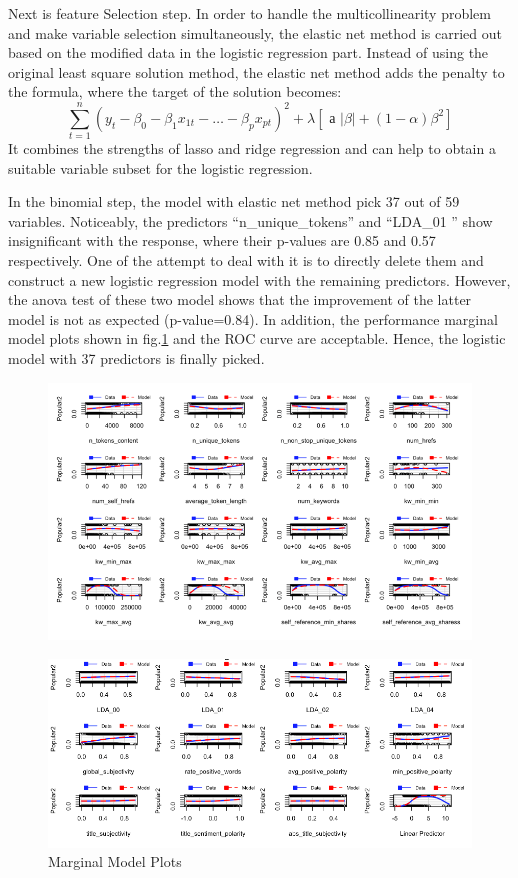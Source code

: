 \documentclass[letterpaper,12pt]{article}
\begin{document}
Next is feature Selection step. In order to handle the multicollinearity problem and make variable selection simultaneously, the elastic net method is carried out based on the modified data in the logistic regression part. Instead of using the original least square solution method, the elastic net method adds the penalty to the formula, where the target of the solution becomes:
\[
\sum_{t=1}^{n}\left(y_{t}-\beta_{0}-\beta_{1} x_{1 t}-\ldots-\beta_{p} x_{p t}\right)^{2}+\lambda\left[\text { а }|\beta|+(1-\alpha) \beta^{2}\right]
\]
It combines the strengths of lasso and ridge regression and can help to obtain a suitable variable subset for the logistic regression.

In the binomial step, the model with elastic net method pick 37 out of 59 variables. Noticeably, the predictors “n\_unique\_tokens” and “LDA\_01 ” show insignificant with the response, where their p-values are 0.85 and 0.57 respectively. One of the attempt to deal with it is to directly delete them and construct a new logistic regression model with the remaining predictors. However, the anova test of these two model shows that the improvement of the latter model is not as expected (p-value=0.84). In addition, the performance marginal model plots shown in fig.\ref{fig10} and the ROC curve are acceptable. Hence, the logistic model with 37 predictors is finally picked.
\begin{figure}
\centering
    \includegraphics[width=0.7\linewidth]{10.1.png}
\end{figure}
\begin{figure}
\centering
    \includegraphics[width=0.7\linewidth]{10.2.png}
    \caption{Marginal Model Plots}
    \label{fig10}
\end{figure}
\end{document}
